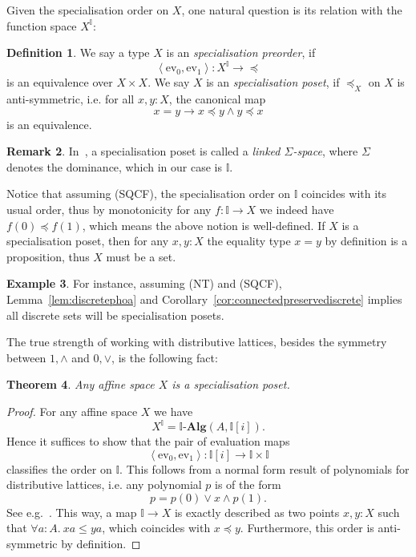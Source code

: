 \documentclass[12pt]{amsart}
\newtheorem{theorem}{Theorem}[section]
\theoremstyle{definition}
\newtheorem{example}[theorem]{Example}
\newtheorem{definition}[theorem]{Definition}
\newtheorem{remark}[theorem]{Remark}
\newcommand{\mb}[1]{\mathbf{#1}}
\newcommand{\mbb}[1]{\mathbb{#1}}
\newcommand{\I}{\mbb I}
\newcommand{\alg}{\text{-}\mb{Alg}}
\newcommand{\pair}[1]{\left\langle#1\right\rangle}
\newcommand{\ev}{\mathrm{ev}}
\newcommand{\fa}[2]{\forall #1\!\colon\!\!#2.\ }
\begin{document}
Given the specialisation order on $X$, one natural question is its relation with the function space $X^\I$: 

\begin{definition}
  We say a type $X$ is an \emph{specialisation preorder}, if 
  \[ \pair{\ev_0,\ev_1} : X^\I \to \operatorname{\preceq} \]
  is an equivalence over $X \times X$. We say $X$ is an \emph{specialisation poset}, if $\preceq_X$ on $X$ is anti-symmetric, i.e. for all $x,y : X$, the canonical map
  \[ x = y \to x \preceq y \wedge y \preceq x \]
  is an equivalence.
\end{definition}

\begin{remark}
  In~\cite{PhoaWesleyKym-Son1991DtiR}, a specialisation poset is called a \emph{linked $\Sigma$-space}, where $\Sigma$ denotes the dominance, which in our case is $\I$. 
\end{remark}

Notice that assuming (SQCF), the specialisation order on $\I$ coincides with its usual order, thus by monotonicity for any $f : \I \to X$ we indeed have $f(0) \preceq f(1)$, which means the above notion is well-defined. If $X$ is a specialisation poset, then for any $x,y : X$ the equality type $x = y$ by definition is a proposition, thus $X$ must be a set. 

\begin{example}
  For instance, assuming (NT) and (SQCF), Lemma~\ref{lem:discretephoa} and Corollary~\ref{cor:connectedpreservediscrete} implies all discrete sets will be specialisation posets.
\end{example}

The true strength of working with distributive lattices, besides the symmetry between $1,\wedge$ and $0,\vee$, is the following fact:

\begin{theorem}\label{thm:phoaaffine}
  Any affine space $X$ is a specialisation poset.
\end{theorem}
\begin{proof}
  For any affine space $X$ we have 
  \[ X^\I = \I\alg(A,\I[i]). \]
  Hence it suffices to show that the pair of evaluation maps
  \[ \pair{\ev_0,\ev_1} : \I[i] \to \I \times \I \]
  classifies the order on $\I$. This follows from a normal form result of polynomials for distributive lattices, i.e. any polynomial $p$ is of the form 
  \[ p = p(0) \vee x \wedge p(1). \]
  See e.g.~\cite[Thm. 10.11]{lausch2000algebra}. This way, a map $\I \to X$ is exactly described as two points $x,y : X$ such that $\fa aA xa \le ya$, which coincides with $x \preceq y$. Furthermore, this order is anti-symmetric by definition.
\end{proof}
\end{document}
